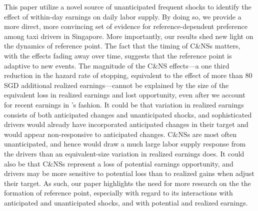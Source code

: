 \documentclass[reviewmode]{restud}
\begin{document}
This paper utilize a novel source of unanticipated frequent shocks to identify the effect of within-day earnings on daily labor supply. By doing so, we provide a more direct, more convincing set of evidence for reference-dependent preference among taxi drivers in Singapore. More importantly, our results shed new light on the dynamics of reference point. The fact that the timing of C\&NSs matters, with the effects fading away over time, suggests that the reference point is adaptive to new events. The magnitude of the C\&NS effects---a one third reduction in the hazard rate of stopping, equivalent to the effect of more than 80 SGD additional realized earnings---cannot be explained by the size of the equivalent loss in realized earnings and lost opportunity, even after we account for recent earnings in \citet{thakral2018daily}'s fashion. It could be that variation in realized earnings consists of both anticipated changes and unanticipated shocks, and sophisticated drivers would already have incorporated anticipated changes in their target and would appear non-responsive to anticipated changes. C\&NSs are most often unanticipated, and hence would draw a much large labor supply response from the drivers than an equivalent-size variation in realized earnings does. It could also be that C\&NSs represent a loss of potential earnings opportunity, and drivers may be more sensitive to potential loss than to realized gains when adjust their target. As such, our paper highlights the need for more research on the the formation of reference point, especially with regard to its interactions with anticipated and unanticipated shocks, and with potential and realized earnings.

\end{document}
